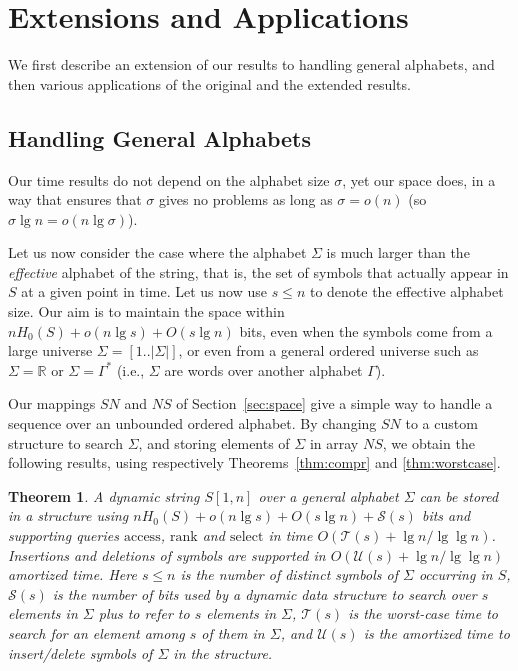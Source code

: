 \documentclass[11pt]{article}
\def\idrm#1{\ensuremath{\mathrm{#1}}}
\newtheorem{theorem}{Theorem}
\newcommand{\ra}{\idrm{rank}}
\newcommand{\sel}{\idrm{select}}
\newcommand{\acc}{\idrm{access}}
\begin{document}
\section{Extensions and Applications}
\label{sec:app}

We first describe an extension of our results to handling general alphabets,
and then various applications of the original and the extended results.

\subsection{Handling General Alphabets}
\label{sec:alphabet}

Our time results do not depend on the alphabet size $\sigma$, yet our space 
does, in a way that ensures that $\sigma$ gives no problems as long as 
$\sigma=o(n)$ (so $\sigma\lg n = o(n\lg\sigma)$).

Let us now consider the case where the alphabet $\Sigma$ is much larger than
the {\em effective} alphabet of the string, that is, the set of symbols that 
actually appear in $S$ at a given point in time. Let us now use $s\le n$
to denote the effective alphabet size. Our aim is to maintain the space within 
$nH_0(S) + o(n\lg s) + O(s\lg n)$ 
bits, even when the symbols come from a large universe $\Sigma=[1..|\Sigma|]$, 
or even from a general ordered universe such as $\Sigma = \mathbb{R}$ or
$\Sigma = \Gamma^*$ (i.e., $\Sigma$ are words over another
alphabet $\Gamma$).

Our mappings $SN$ and $NS$ of Section~\ref{sec:space} 
give a simple way to handle a 
sequence over an unbounded ordered alphabet. By changing $SN$
to a custom structure to search $\Sigma$, and storing elements of 
$\Sigma$ in array $NS$, we obtain the following results, using respectively
Theorems~\ref{thm:compr} and \ref{thm:worstcase}.

\begin{theorem}
\label{thm:general}
A dynamic string $S[1,n]$ over a general alphabet $\Sigma$ 
can be stored in a structure using 
$nH_0(S) + o(n\lg s) + O(s\lg n) + \mathcal{S}(s)$ 
bits and supporting queries
$\acc$, $\ra$ and $\sel$ in time 
$O(\mathcal{T}(s)+\lg n/\lg \lg n)$.
Insertions and deletions of symbols 
are supported in $O(\mathcal{U}(s)+\lg n/\lg\lg n)$ amortized 
time. 
Here $s\le n$ is the number of distinct symbols of $\Sigma$ occurring in $S$,
$\mathcal{S}(s)$ is the number of bits used by a dynamic data structure 
to search over $s$ elements in $\Sigma$ plus to refer to $s$ 
elements in $\Sigma$, $\mathcal{T}(s)$ is the worst-case time to search 
for an element among $s$ of them in $\Sigma$, and $\mathcal{U}(s)$
is the amortized time to insert/delete symbols of $\Sigma$ in the structure.
\end{theorem}
\end{document}
